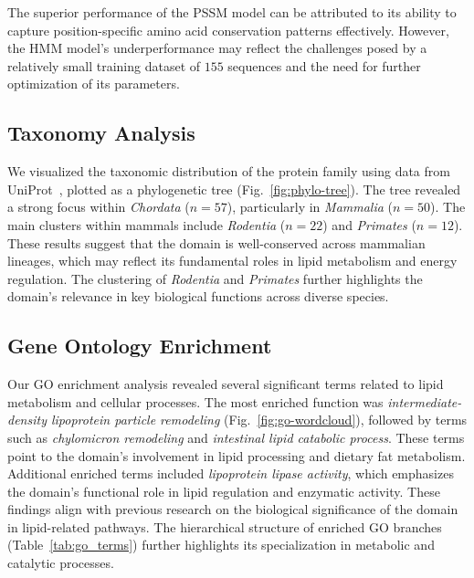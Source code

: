 The superior performance of the PSSM model can be attributed to its ability to capture position-specific amino acid conservation patterns effectively. However, the HMM model's underperformance may reflect the challenges posed by a relatively small training dataset of $155$ sequences and the need for further optimization of its parameters.

\subsection{Taxonomy Analysis}
We visualized the taxonomic distribution of the protein family using data from UniProt~\cite{uniprot}, plotted as a phylogenetic tree (Fig.~\ref{fig:phylo-tree}). The tree revealed a strong focus within \textit{Chordata} ($n=57$), particularly in \textit{Mammalia} ($n=50$). The main clusters within mammals include \textit{Rodentia} ($n=22$) and \textit{Primates} ($n=12$). These results suggest that the domain is well-conserved across mammalian lineages, which may reflect its fundamental roles in lipid metabolism and energy regulation. The clustering of \textit{Rodentia} and \textit{Primates} further highlights the domain's relevance in key biological functions across diverse species. 

\subsection{Gene Ontology Enrichment}
Our GO enrichment analysis revealed several significant terms related to lipid metabolism and cellular processes. The most enriched function was \textit{intermediate-density lipoprotein particle remodeling} (Fig.~\ref{fig:go-wordcloud}), followed by terms such as \textit{chylomicron remodeling} and \textit{intestinal lipid catabolic process}. These terms point to the domain's involvement in lipid processing and dietary fat metabolism. Additional enriched terms included \textit{lipoprotein lipase activity}, which emphasizes the domain's functional role in lipid regulation and enzymatic activity. These findings align with previous research on the biological significance of the domain in lipid-related pathways. The hierarchical structure of enriched GO branches (Table~\ref{tab:go_terms}) further highlights its specialization in metabolic and catalytic processes.

